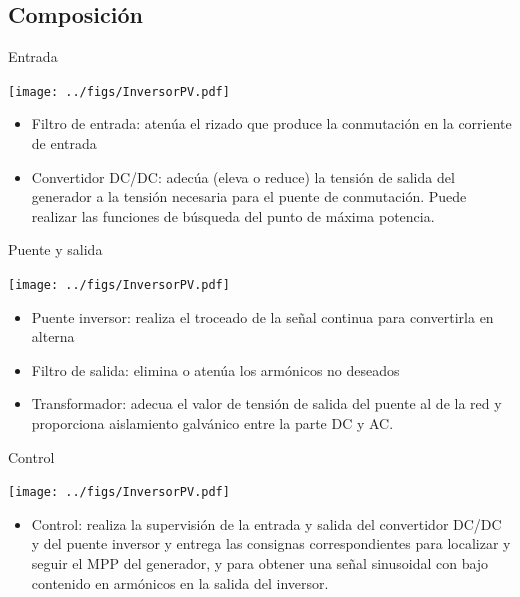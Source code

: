 \documentclass[xcolor={usenames,svgnames,dvipsnames}]{beamer}
\begin{document}
\subsection{Composición}
\label{sec:org6d58a08}
\begin{frame}[label={sec:orgea0ed79}]{Entrada}
\begin{center}
\texttt{[image: ../figs/InversorPV.pdf]}
\end{center}

\begin{itemize}
\item \alert{Filtro de entrada}: atenúa el rizado que produce la conmutación en
la corriente de entrada

\item \alert{Convertidor DC/DC}: adecúa (eleva o reduce) la tensión de salida del
generador a la tensión necesaria para el puente de conmutación. Puede
realizar las funciones de búsqueda del punto de máxima potencia.
\end{itemize}
\end{frame}

\begin{frame}[label={sec:org8327eec}]{Puente y salida}
\begin{center}
\texttt{[image: ../figs/InversorPV.pdf]}
\end{center}

\begin{itemize}
\item \alert{Puente inversor}: realiza el troceado de la señal continua para
convertirla en alterna

\item \alert{Filtro de salida}: elimina o atenúa los armónicos no deseados

\item \alert{Transformador}: adecua el valor de tensión de salida del puente al
de la red y proporciona aislamiento galvánico entre la parte DC y
AC.
\end{itemize}
\end{frame}

\begin{frame}[label={sec:org376e098}]{Control}
\begin{center}
\texttt{[image: ../figs/InversorPV.pdf]}
\end{center}

\begin{itemize}
\item \alert{Control}: realiza la supervisión de la entrada y salida del
convertidor DC/DC y del puente inversor y entrega las consignas
correspondientes para localizar y seguir el MPP del generador, y para
obtener una señal sinusoidal con bajo contenido en armónicos en la
salida del inversor.
\end{itemize}
\end{frame}
\end{document}
